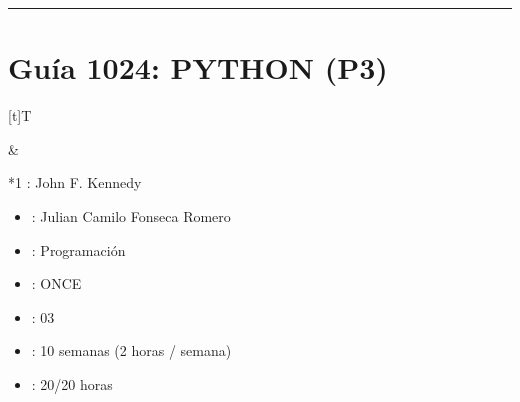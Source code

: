 \documentclass[letterpaper,10pt,spanish]{sphinxmanual}
\begin{document}
\bigskip\hrule\bigskip


\sphinxstepscope


\section{Guía 1024: PYTHON (P3)}
\label{\detokenize{1_guias/10programacion/G1024:guia-1024-python-p3}}\label{\detokenize{1_guias/10programacion/G1024::doc}}

\begin{savenotes}\sphinxattablestart
\sphinxthistablewithglobalstyle
\centering
\begin{tabular}[t]{}
\sphinxtoprule
\sphinxtableatstartofbodyhook

\begin{savenotes}\sphinxattablestart
\sphinxthistablewithglobalstyle
\centering
\begin{tabulary}{\linewidth}[t]{T}
\sphinxtoprule
\sphinxtableatstartofbodyhook
\sphinxAtStartPar
{}
\\
\sphinxbottomrule
\end{tabulary}
\sphinxtableafterendhook\par
\sphinxattableend\end{savenotes}
&

\begin{savenotes}\sphinxattablestart
\sphinxthistablewithglobalstyle
\raggedright
\begin{tabular}[t]{*{1}{}}
\sphinxtoprule
\sphinxtableatstartofbodyhook
\sphinxAtStartPar
{}: John F. Kennedy
\begin{itemize}
\item {} 
\sphinxAtStartPar
{}: Julian Camilo Fonseca Romero

\item {} 
\sphinxAtStartPar
{}: Programación

\item {} 
\sphinxAtStartPar
{}: ONCE

\item {} 
\sphinxAtStartPar
{}: 03

\item {} 
\sphinxAtStartPar
{}: 10 semanas (2 horas / semana)

\item {} 
\sphinxAtStartPar
{}: 20/20 horas

\end{itemize}
\\
\sphinxbottomrule
\end{tabular}
\sphinxtableafterendhook\par
\sphinxattableend\end{savenotes}
\\
\sphinxbottomrule
\end{tabular}
\sphinxtableafterendhook\par
\sphinxattableend\end{savenotes}
\end{document}
